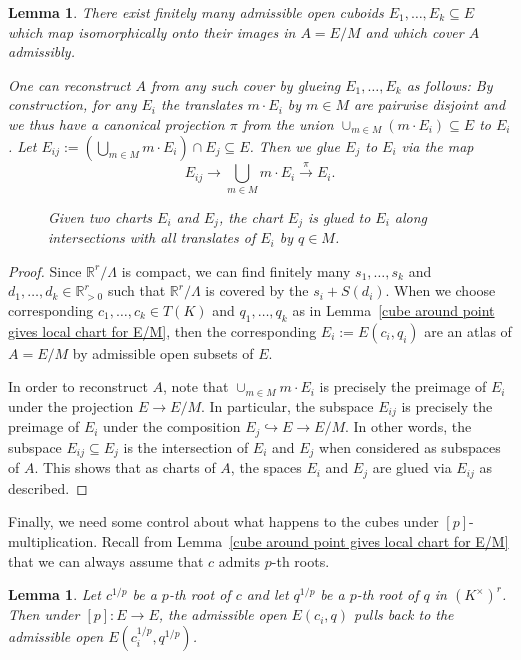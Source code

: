 \documentclass[10pt,oneside]{amsart}
\newtheorem{lemma}[theorem]{Lemma}
\theoremstyle{definition}
\begin{document}
	\begin{lemma}\label{an admissible cover of A by cuboids of E}
	There exist finitely many admissible open cuboids $E_1,\dots,E_k\subseteq E$ which map isomorphically onto their images in $A=E/M$ and which cover $A$ admissibly. 
	
	One can reconstruct $A$ from any such cover by glueing $E_1,\dots,E_k$ as follows: By construction, for any $E_i$ the translates $m\cdot E_i$ by $m\in M$ are pairwise disjoint and we thus have a canonical projection $\pi$ from the union $\cup_{m\in M} (m\cdot E_i)\subseteq E$ to $E_i$.	Let $E_{ij}:=(\bigcup_{m\in M} m\cdot E_i)\cap E_j \subseteq E$. Then we glue $E_j$ to $E_i$ via the map
	\[E_{ij}\rightarrow \bigcup_{m\in M} m\cdot E_i \xrightarrow{\pi} E_i.\]
	
	\begin{figure}
		\caption{Given two charts $E_i$ and $E_j$, the chart $E_j$ is glued to $E_i$ along intersections with all translates of $E_i$ by $q\in M$.}
		\label{glue-cover-tikzpicture}
	\end{figure}
	
	\end{lemma} 
	\begin{proof}
	Since $\mathbb R^r/\Lambda$ is compact, we can find finitely many $s_1,\dots,s_k$ and $d_1,\dots,d_k \in \mathbb{R}^r_{>0}$ such that $\mathbb R^r/\Lambda$ is covered by the $s_i+S(d_i)$. When we choose corresponding $c_1,\dots,c_k \in T(K)$ and $q_1,\dots,q_k$ as in Lemma~\ref{cube around point gives local chart for E/M}, then the corresponding $E_i:=E(c_i,q_i)$ are an atlas of $A=E/M$ by admissible open subsets of $E$.
	
	In order to reconstruct $A$, note that $\cup_{m\in M} m\cdot E_i$ is precisely the preimage of $E_i$ under the projection $E\rightarrow E/M$. In particular, the subspace $E_{ij}$ is precisely the preimage of $E_i$ under the composition $E_j\hookrightarrow E \rightarrow E/M$. In other words, the subspace $E_{ij}\subseteq E_j$ is the intersection of $E_i$ and $E_j$ when considered as subspaces of $A$. This shows that as charts of $A$, the spaces $E_i$ and $E_j$ are glued via $E_{ij}$ as described.
	\end{proof}
	Finally, we need some control about what happens to the cubes under $[p]$-multiplication. Recall from Lemma~\ref{cube around point gives local chart for E/M} that we can always assume that $c$ admits $p$-th roots.
	\begin{lemma}\label{pullback of cuboid is cuboid}
		Let $c^{1/p}$ be a $p$-th root of $c$ and let $q^{1/p}$ be a $p$-th root of $q$ in $(K^\times)^r$. Then under $[p]:E\rightarrow E$, the admissible open $E(c_i,q)$ pulls back to the admissible open $E(c_i^{1/p},q^{1/p})$.
	\end{lemma}
\end{document}

